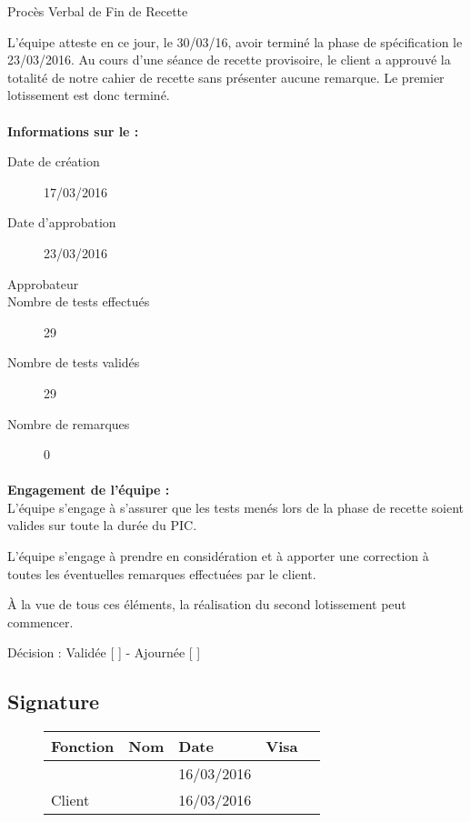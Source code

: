 \documentclass[asi, sansVersion]{picInsa}
\begin{document}
 
 \begin{center}
  \LARGE{}
    Procès Verbal de Fin de Recette\\
 \end{center}
 
 \normalsize{}
 
L'équipe \nomEquipe{} atteste en ce jour, le 30/03/16, avoir terminé la phase de spécification le 23/03/2016.
Au cours d'une séance de recette provisoire, le client a approuvé la totalité de notre cahier de recette sans présenter aucune remarque. Le premier lotissement est donc terminé.


\paragraph{}
\textbf{Informations sur le \CDR :}

\begin{description}
  \item[Date de création]17/03/2016
  \item[Date d'approbation]23/03/2016
  \item[Approbateur]\nomClient
  \item[Nombre de tests effectués]29
  \item[Nombre de tests validés]29
  \item[Nombre de remarques]0
\end{description}


\paragraph{}
\textbf{Engagement de l'équipe :}\\


L'équipe \nomEquipe{} s'engage à s'assurer que les tests menés lors de la phase de recette soient valides sur toute la durée du PIC.


L'équipe \nomEquipe{} s'engage à prendre en considération et à apporter une correction à toutes les éventuelles remarques effectuées par le client.

À la vue de tous ces éléments, la réalisation du second lotissement peut commencer.

\begin{center}
Décision : Validée [ \checkmark{} ] - Ajournée [ ]
\end{center}

\subsection*{Signature}
\begin{figure}[H]
		\centering
		\begin{tabularx}{17cm}{|p{4cm}|X|X|X|X|}
		\hline
		\rowcolor[gray]{0.85} Fonction & Nom & Date & Visa \\
		\hline
		\CP{} & \Sergi{} & 16/03/2016 & \\
		\hline
		Client & \nomClient & 16/03/2016 & \\
		\hline
		\end{tabularx}
\end{figure}
\end{document}
